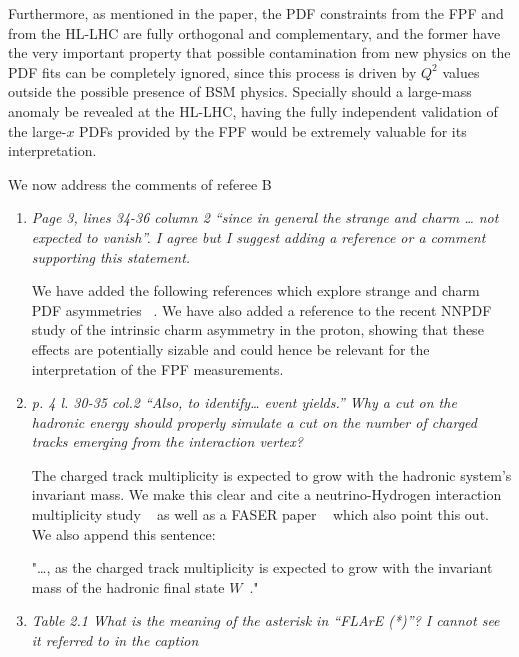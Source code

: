 \documentclass[11pt,a4paper]{article}
\begin{document}
\begin{enumerate}
        Furthermore, as mentioned in the paper, the PDF constraints from the FPF and from the HL-LHC are
        fully orthogonal and complementary, and the former have the very important property that
        possible contamination from new physics on the PDF fits can be completely ignored, since
        this process is driven by $Q^2$ values outside the possible presence of BSM physics.
        Specially should a large-mass anomaly be revealed at the HL-LHC, having the fully independent
        validation of the large-$x$ PDFs provided by the FPF would be extremely valuable for its
        interpretation.

\end{enumerate}

\noindent
We now address the comments of referee B

\begin{enumerate}
\item{\it Page 3, lines 34-36 column 2 “since in general the strange and charm … not expected to vanish”. I agree but I suggest adding a reference or a comment supporting this statement. }

  We have added the following references which explore strange and charm PDF asymmetries ~\cite{Sufian:2018cpj, Sufian:2020coz}.
  We have also added a reference to the recent NNPDF study of the intrinsic charm asymmetry in the proton,
  showing that these effects are potentially sizable and could hence be relevant for the interpretation
  of the FPF measurements.

\item{\it p. 4 l. 30-35 col.2 “Also, to identify… event yields.” Why a cut on the hadronic energy should properly simulate a cut on the number of charged tracks emerging from the interaction vertex?}

The charged track multiplicity is expected to grow with the hadronic system’s invariant mass. We make this clear and cite a neutrino-Hydrogen interaction multiplicity study ~\cite{Aachen-Bonn-CERN-Munich-Oxford:1981lfk} as well as a FASER paper ~\cite{FASER:2019dxq} which also point this out. We also append this sentence:

"…, as the charged track multiplicity is expected to grow with the invariant mass of the hadronic
final state $W$~\cite{Aachen-Bonn-CERN-Munich-Oxford:1981lfk,FASER:2019dxq}."


\item{\it Table 2.1 What is the meaning of the asterisk in “FLArE (*)”? I cannot see it referred to in the caption} 


\end{enumerate}
\end{document}
